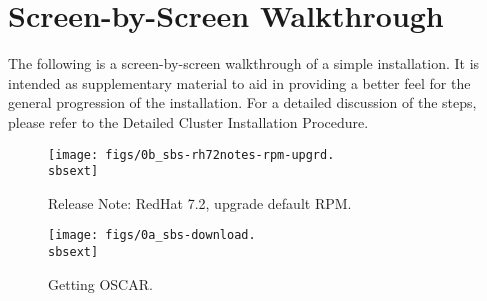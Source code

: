 %
%
%

\newpage

\section{Screen-by-Screen Walkthrough}
\label{app:screen-by-screen}


The following is a screen-by-screen walkthrough of a simple installation.
It is intended as supplementary material to aid in providing a better feel
for the general progression of the installation.  For a detailed discussion
of the steps, please refer to the Detailed Cluster Installation Procedure.

\setlength{\oddsidemargin}{-0.5in}
\setlength{\evensidemargin}{-0.5in}
\setlength{\textwidth}{7.5in}

\begin{figure}[htbp]
  \begin{center}
    \texttt{[image: figs/0b\_sbs-rh72notes-rpm-upgrd.\\sbsext]}
    \caption{Release Note: RedHat 7.2, upgrade default RPM.}
    \label{fig:sbs-rh72notes-rpm-upgrd}
  \end{center}
\end{figure}


\begin{figure}[htbp]
  \begin{center}
    \texttt{[image: figs/0a\_sbs-download.\\sbsext]}
    \caption{Getting OSCAR.}
    \label{fig:sbs-getting-oscar}
  \end{center}
\end{figure}


